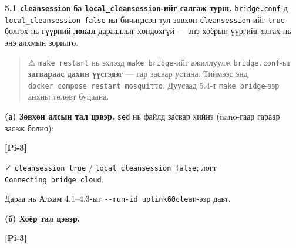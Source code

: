 \textbf{5.1 \texttt{cleansession} ба \texttt{local\_\allowbreak{}cleansession}-ийг салгаж турш.} \texttt{bridge.conf}-д \texttt{local\_\allowbreak{}cleansession\ false} \textbf{ил} бичигдсэн тул зөвхөн \texttt{cleansession}-ийг \texttt{true} болгох нь гүүрний \textbf{локал} дарааллыг хөндөхгүй --- энэ хоёрын үүргийг ялгах нь энэ алхмын зорилго.

\begin{quote}
⚠ \texttt{make\ restart} нь эхлээд \texttt{make\ bridge}-ийг ажиллуулж \texttt{bridge.conf}-ыг \textbf{загвараас дахин үүсгэдэг} --- гар засвар устана. Тиймээс энд \texttt{docker\ compose\ restart\ mosquitto}. Дуусаад 5.4-т \texttt{make\ bridge}-ээр анхны төлөвт буцаана.
\end{quote}

\textbf{(а) Зөвхөн алсын тал цэвэр.} \texttt{sed} нь файлд засвар хийнэ (nano-гаар гараар засаж болно):

\textbf{{[}Pi-3{]}}

\begin{Shaded}
\begin{Highlighting}[]
\KeywordTok{;} \KeywordTok{|} 
\end{Highlighting}
\end{Shaded}

✓ \texttt{cleansession\ true} / \texttt{local\_\allowbreak{}cleansession\ false}; логт \texttt{Connecting\ bridge\ cloud}.

Дараа нь Алхам 4.1--4.3-ыг \texttt{-\/\allowbreak{}-run-id\ uplink60clean}-ээр давт.

\textbf{(б) Хоёр тал цэвэр.}

\textbf{{[}Pi-3{]}}

\begin{Shaded}
\begin{Highlighting}[]
\end{Highlighting}
\end{Shaded}

